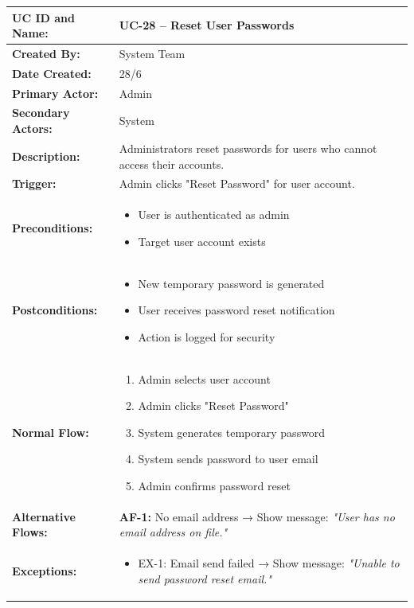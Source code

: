 \documentclass[12pt,a4paper]{article}
\begin{document}
\renewcommand{\arraystretch}{1.5}
\begin{longtable}{|p{4.5cm}|p{10.5cm}|}
\hline
\textbf{UC ID and Name:} & UC-28 – Reset User Passwords \\
\hline
\textbf{Created By:} & System Team \\
\hline
\textbf{Date Created:} & 28/6 \\
\hline
\textbf{Primary Actor:} & Admin \\
\hline
\textbf{Secondary Actors:} & System \\
\hline
\textbf{Description:} & Administrators reset passwords for users who cannot access their accounts. \\
\hline
\textbf{Trigger:} & Admin clicks "Reset Password" for user account. \\
\hline
\textbf{Preconditions:} &
\begin{itemize}
  \item User is authenticated as admin
  \item Target user account exists
\end{itemize} \\
\hline
\textbf{Postconditions:} &
\begin{itemize}
  \item New temporary password is generated
  \item User receives password reset notification
  \item Action is logged for security
\end{itemize} \\
\hline
\textbf{Normal Flow:} &
\begin{enumerate}
  \item Admin selects user account
  \item Admin clicks "Reset Password"
  \item System generates temporary password
  \item System sends password to user email
  \item Admin confirms password reset
\end{enumerate} \\
\hline
\textbf{Alternative Flows:} &
\textbf{AF-1:} No email address → Show message: \textit{"User has no email address on file."} \\
\hline
\textbf{Exceptions:} &
\begin{itemize}
  \item EX-1: Email send failed → Show message: \textit{"Unable to send password reset email."}
\end{itemize} \\

\end{longtable}
\end{document}
